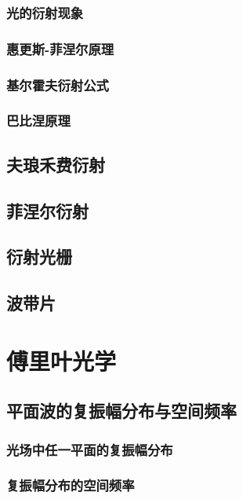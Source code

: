 \documentclass[cn,10pt,chinesefont=founder,math=mtpro2,cite=super,toc=onecol,twoside,openany]{elegantbook}
\begin{document}
\subsection{光的衍射现象}

\subsection{惠更斯-菲涅尔原理}

\subsection{基尔霍夫衍射公式}

\subsection{巴比涅原理}

\section{夫琅禾费衍射}

\section{菲涅尔衍射}

\section{衍射光栅}

\section{波带片}

\chapter{傅里叶光学}

\section{平面波的复振幅分布与空间频率}

\subsection{光场中任一平面的复振幅分布}

\subsection{复振幅分布的空间频率}
\end{document}
